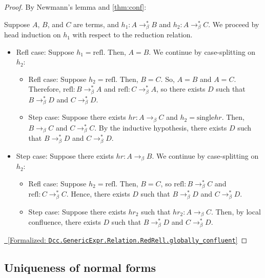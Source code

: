 \documentclass{article}
\newcommand{\leanlink}[2]{
  \hfill \href{#1}{\textcolor{leanblue}\faCheckSquare~[Formalized: \texttt{#2}]}%
}
\newcommand{\arr}{\rightarrow}
\newcommand{\barr}{\arr_{\beta}}
\begin{document}
\begin{proof}
  By Newmann's lemma \autocite{newman1942theories} and \ref{thm:conf}:

  Suppose \(A\), \(B\), and \(C\) are terms, and \(h_{1} : A \barr^{*} B\) and \(h_{2} : A \barr^{*} C\). We proceed by head induction on \(h_{1}\) with respect to the reduction relation.
  \begin{itemize}
    \item Refl case:
      Suppose \(h_{1} = \text{refl}\). Then, \(A = B\). We continue by case-splitting on \(h_{2}\):
      \begin{itemize}
        \item Refl case:
          Suppose \(h_{2} = \text{refl}\). Then, \(B = C\). So, \(A = B\) and \(A = C\). Therefore, \(\text{refl} : B \barr^{*} A\) and \(\text{refl} : C \barr^{*} A\), so there exists \(D\) such that \(B \barr^{*} D\) and \(C \barr^{*} D\).
        \item Step case:
          Suppose there exists \(hr : A \barr C\) and \(h_{2} = \text{single} hr\). Then, \(B \barr C\) and \(C \barr^{*} C\). By the inductive hypothesis, there exists \(D\) such that \(B \barr^{*} D\) and \(C \barr^{*} D\).
      \end{itemize}
    \item Step case:
      Suppose there exists \(hr : A \barr B\). We continue by case-splitting on \(h_{2}\):
        \begin{itemize}
          \item Refl case:
            Suppose \(h_{2} = \text{refl}\). Then, \(B = C\), so \(\text{refl} : B \barr^{*} C\) and \(\text{refl} : C \barr^{*} C\). Hence, there exists \(D\) such that \(B \barr^{*} D\) and \(C \barr^{*} D\).
          \item Step case:
            Suppose there exists \(hr_{2}\) such that \(hr_{2} : A \barr C\). Then, by local confluence, there exists \(D\) such that \(B \barr^{*} D\) and \(C \barr^{*} D\).
        \end{itemize}
  \end{itemize}
  \hfill\leanlink{https://github.com/lexzaiello/DCC/blob/7b316fc3eb8aac4736e30d5e9a58918d5215c334/Dcc/Relation.lean\#L283}{Dcc.GenericExpr.Relation.RedRell.globally\_confluent}
\end{proof}

\subsection{Uniqueness of normal forms}
\end{document}
